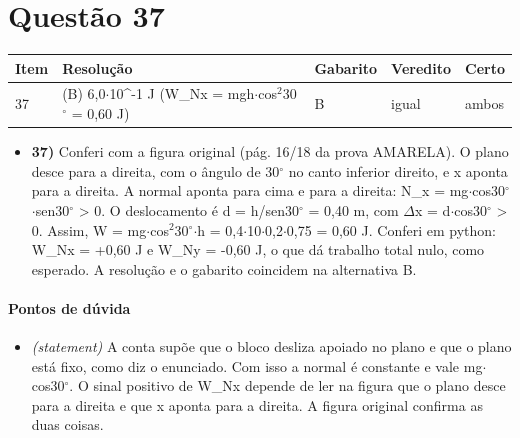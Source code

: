 \documentclass{article}%
\begin{document}
\section*{Questão 37}%
\begin{longtable}{@{}p{} p{} p{} p{} p{}@{}}\toprule Item & Resolução & Gabarito & Veredito & Certo \\ \midrule
37 & (B) 6,0$\cdot$10\^{}{-}1 J (W\_Nx = mgh$\cdot$cos$^2$30$^\circ$ = 0,60 J) & B & igual & ambos \\
\bottomrule\end{longtable}%
\begin{itemize}%
\item%
\textbf{37)} Conferi com a figura original (pág. 16/18 da prova AMARELA). O plano desce para a direita, com o ângulo de 30$^\circ$ no canto inferior direito, e x aponta para a direita. A normal aponta para cima e para a direita: N\_x = mg$\cdot$cos30$^\circ$$\cdot$sen30$^\circ$ > 0. O deslocamento é d = h/sen30$^\circ$ = 0,40 m, com $\Delta$x = d$\cdot$cos30$^\circ$ > 0. Assim, W = mg$\cdot$cos$^2$30$^\circ$$\cdot$h = 0,4$\cdot$10$\cdot$0,2$\cdot$0,75 = 0,60 J. Conferi em python: W\_Nx = +0,60 J e W\_Ny = -0,60 J, o que dá trabalho total nulo, como esperado. A resolução e o gabarito coincidem na alternativa B.%
\end{itemize}%
\paragraph{Pontos de dúvida}%
\begin{itemize}%
\item%
\textit{(statement)} A conta supõe que o bloco desliza apoiado no plano e que o plano está fixo, como diz o enunciado. Com isso a normal é constante e vale mg$\cdot$cos30$^\circ$. O sinal positivo de W\_Nx depende de ler na figura que o plano desce para a direita e que x aponta para a direita. A figura original confirma as duas coisas.%
\end{itemize}%
\end{document}
